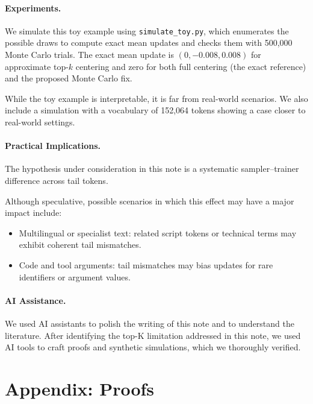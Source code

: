 \documentclass[10pt]{article}
\begin{document}
\paragraph{Experiments.}
We simulate this toy example using \texttt{simulate\_toy.py}, which enumerates the possible draws to compute exact mean updates and checks them with 500,000 Monte Carlo trials. The exact mean update is $(0,-0.008,0.008)$ for approximate top-$k$ centering and zero for both full centering (the exact reference) and the proposed Monte Carlo fix.

While the toy example is interpretable, it is far from real-world scenarios. We also include a simulation with a vocabulary of 152,064 tokens showing a case closer to real-world settings.

\paragraph{Practical Implications.}
The hypothesis under consideration in this note is a systematic sampler--trainer difference across tail tokens. 

Although speculative, possible scenarios in which this effect may have a major impact include:
\begin{itemize}
    \item Multilingual or specialist text: related script tokens or technical terms may exhibit coherent tail mismatches.
    \item Code and tool arguments: tail mismatches may bias updates for rare identifiers or argument values.
\end{itemize}


\paragraph{AI Assistance.}
We used AI assistants to polish the writing of this note and to understand the literature. After identifying the top-K limitation addressed in this note, we used AI tools to craft proofs and synthetic simulations, which we thoroughly verified.







\clearpage
\section*{Appendix: Proofs}
\label{app:proofs}
\setcounter{equation}{0}
\renewcommand{\theequation}{A.\arabic{equation}}
\end{document}
